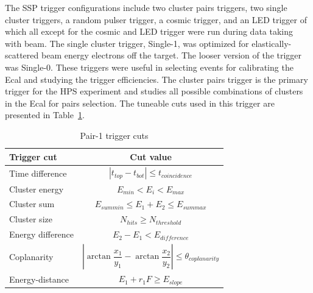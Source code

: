 \documentclass[12pt]{report}
\begin{document}
\indent The SSP trigger configurations include two cluster pairs triggers, two single cluster triggers, a random pulser trigger, a cosmic trigger, and an LED trigger of which all except for the cosmic and LED trigger were run during data taking with beam. The single cluster trigger, Single-1, was optimized for elastically-scattered beam energy electrons off the target. The looser version of the trigger was Single-0. These triggers were useful in selecting events for calibrating the Ecal and studying the trigger efficiencies. The cluster pairs trigger is the primary trigger for the HPS experiment and studies all possible combinations of clusters in the Ecal for pairs selection. The tuneable cuts used in this trigger are presented in Table~\ref{tab:pairTriggerCuts}. 

\begin{table}[H]
\caption{Pair-1 trigger cuts}
\label{tab:pairTriggerCuts}
\centering
\begin{tabular}{lc}
\toprule
Trigger cut & Cut value \\
\midrule
Time difference & $| t_{top}-t_{bot} | \leq t_{coincidence}$   \\
Cluster energy & $E_{min}<E_{i}<E_{max}$\\
Cluster sum & $E_{sum min}\leq E_1+E_2\leq E_{sum max}$\\
Cluster size & $N_{hits}\geq N_{threshold}$\\
Energy difference & $ E_{2}-E_{1}<E_{difference}$\\
Coplanarity & $ |\arctan\dfrac{x_1}{y_1}-\arctan\dfrac{x_2}{y_2} | \leq \theta_{coplanarity}$\\
Energy-distance & $E_{1}+r_{1}F\geq E_{slope}$ \\ 
\bottomrule
\end{tabular}
\end{table}
\end{document}
